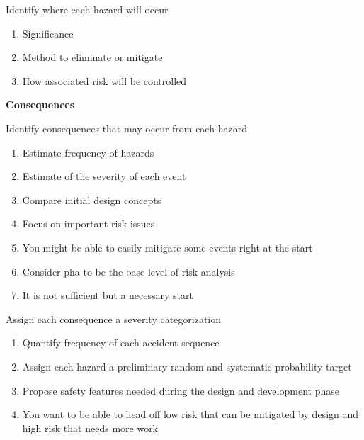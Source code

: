 \documentclass[aspectratio=1610,pdftex,dvipsnames,compress,xcolor={dvipsnames}]{beamer}
\newcommand{\acs}{\acrshort} %
\begin{document}
\begin{frame}{Identify where each hazard will occur}
    \begin{enumerate}[series=outerlist,topsep=0pt,itemsep=21pt,leftmargin=*,label=(\arabic*)]
        \item[]Significance
        \item[]Method to eliminate or mitigate
        \item[]How associated risk will be controlled
    \end{enumerate}
\end{frame}


\begin{frame}[plain]{}
    \centering\LARGE\textbf{Consequences}
\end{frame}


\addtocounter{framenumber}{-1}
\begin{frame}{Identify consequences that may occur from each hazard}
    \begin{enumerate}[series=outerlist,topsep=0pt,itemsep=9pt,leftmargin=*,label=(\arabic*)]
        \item[]Estimate frequency of hazards  
        \item[]Estimate of the severity of each event  
        \item[]Compare initial design concepts  
        \item[]Focus on important risk issues  
        \item[]You might be able to easily mitigate some events right at the start
        \item[]Consider \acs{pha} to be the base level of risk analysis  
        \item[]It is not sufficient but a necessary start
    \end{enumerate}
\end{frame}


\begin{frame}{Assign each consequence a severity categorization}
    \begin{enumerate}[series=outerlist,topsep=0pt,itemsep=21pt,leftmargin=*,label=(\arabic*)]
        \item[]Quantify frequency of each accident sequence
        \item[]Assign each hazard a preliminary random and systematic probability target
        \item[]Propose safety features needed during the design and development phase
        \item[]You want to be able to head off low risk that can be mitigated by design and high risk that needs more work 
    \end{enumerate}
\end{frame}
\end{document}
